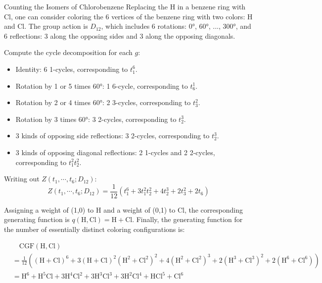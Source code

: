 \begin{example}{Counting the Isomers of Chlorobenzene}{}
    Replacing the H in a benzene ring with Cl, one can consider coloring the 6 vertices of the benzene ring with two colors: H and Cl. The group action is $D_{12}$, which includes 6 rotations: 0°, 60°, ..., 300°, and 6 reflections: 3 along the opposing sides and 3 along the opposing diagonals.

    Compute the cycle decomposition for each \(g\):
    \begin{itemize}
        \item Identity: 6 1-cycles, corresponding to \(t_1^6\).
        \item Rotation by 1 or 5 times 60°: 1 6-cycle, corresponding to \(t_6^1\).
        \item Rotation by 2 or 4 times 60°: 2 3-cycles, corresponding to \(t_3^2\).
        \item Rotation by 3 times 60°: 3 2-cycles, corresponding to \(t_2^3\).
        \item 3 kinds of opposing side reflections: 3 2-cycles, corresponding to \(t_2^3\).
        \item 3 kinds of opposing diagonal reflections: 2 1-cycles and 2 2-cycles, corresponding to \(t_1^2t_2^2\).
    \end{itemize}

    Writing out \(Z(t_1,\cdots,t_6;D_{12})\):
    \[
        Z(t_1,\cdots,t_6;D_{12})=\frac{1}{12}\left(t_1^6+3 t_1^2 t_2^2+4 t_2^3+2 t_3^2+2 t_6\right)
    \]

    Assigning a weight of (1,0) to H and a weight of (0,1) to Cl, the corresponding generating function is \(q(\text{H},\text{Cl})=\text{H}+\text{Cl}\). Finally, the generating function for the number of essentially distinct coloring configurations is:

    \[
        \begin{aligned}
             & \quad \mathrm{CGF}(\text{H},\text{Cl})                                                                                                                                                                                           \\
             & =\frac{1}{12}\left((\text{H}+\text{Cl})^6+3(\text{H}+\text{Cl})^2\left(\text{H}^2+\text{Cl}^2\right)^2+4\left(\text{H}^2+\text{Cl}^2\right)^3+2\left(\text{H}^3+\text{Cl}^3\right)^2+2\left(\text{H}^6+\text{Cl}^6\right)\right) \\
             & =\text{H}^6+\text{H}^5 \text{Cl}+3 \text{H}^4 \text{Cl}^2+3 \text{H}^3 \text{Cl}^3+3 \text{H}^2 \text{Cl}^4+\text{H} \text{Cl}^5+\text{Cl}^6
        \end{aligned}
    \]


\end{example}
